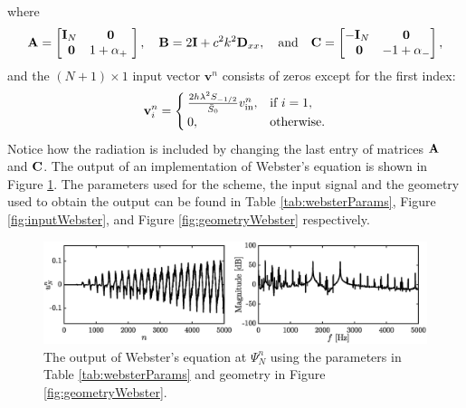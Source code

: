 where 
\begin{equation*}
    \begin{gathered}
    \mathbf{A} = \begin{bmatrix}
        \mathbf{I}_{N}& \mathbf{0}\\\
        \mathbf{0} & 1 + \alpha_+\
    \end{bmatrix}, \quad \mathbf{B} = 2\mathbf{I} + c^2 k^2 \mathbf{D}_{xx}, \quad \text{and} \quad \mathbf{C} = \begin{bmatrix}
        -\mathbf{I}_N & \mathbf{0}\\\
        \mathbf{0}& -1 + \alpha_-
    \end{bmatrix},
    \end{gathered}
\end{equation*}
and the $(N+1)\times 1$ input vector $\mathbf{v}^n$ consists of zeros except for the first index:
\begin{equation}
    \mathbf{v}_i^n = 
    \begin{cases}
        \frac{2h \lambda^2 S_{-1/2}}{\bar{S}_0}v_\text{in}^n, & \text{if } i = 1,\\
        0,& \text{otherwise}.
    \end{cases}
\end{equation}
%
Notice how the radiation is included by changing the last entry of matrices $\mathbf{A}$ and $\mathbf{C}$.
The output of an implementation of Webster's equation is shown in Figure \ref{fig:outputWebster}. The parameters used for the scheme, the input signal and the geometry used to obtain the output can be found in Table \ref{tab:websterParams}, Figure \ref{fig:inputWebster}, and Figure \ref{fig:geometryWebster} respectively.
\begin{figure}[h]
    \centering
    \includegraphics[width=\textwidth]{figures/resonators/brass/outputWebster.eps}
    \caption{The output of Webster's equation at $\Psi_N^n$ using the parameters in Table \ref{tab:websterParams} and geometry in Figure \ref{fig:geometryWebster}. \label{fig:outputWebster}}
\end{figure}


